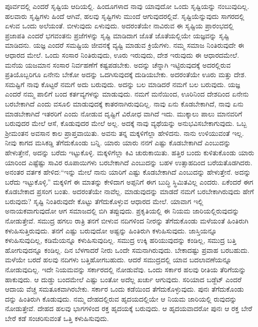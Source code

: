 ಪೂರ್ವದಲ್ಲಿ ಎಂದರೆ ಸೃಷ್ಟಿಯ ಆದಿಯಲ್ಲಿ. ಹಿಂದೂಗಳಾದ ನಾವು ಯಾವುದೋ ಒಂದು ಸೃಷ್ಟಿಯನ್ನು ನಂಬುವುದಿಲ್ಲ. ಹಲವಾರು ಸೃಷ್ಟಿಗಳು ಹಿಂದೆ ಆಗಿವೆ, ಹಲವು ಸೃಷ್ಟಿಗಳು ಮುಂದೆ ಆಗುವುದರಲ್ಲಿವೆ. ಸೃಷ್ಟಿಯೆನ್ನುವುದು ಸಾಗರದಲ್ಲಿ ಏಳುವ ಒಂದು ಅಲೆಯಂತೆ. ಬೀಳುವುದು ಏಳುವುದು. ಅದರಂತೆಯೇ ನಾವಿರುವ ಈ ಸೃಷ್ಟಿಯ ಪ್ರಾರಂಭದಲ್ಲಿ ಪ್ರಜಾಪತಿ ಎಂದರೆ ಭಗವಂತನು ಪ್ರಜೆಗಳನ್ನು ಸೃಷ್ಟಿ ಮಾಡಿದಾಗ ಜೊತೆ ಜೊತೆಯಲ್ಲಿಯೇ ಯಜ್ಞವನ್ನು ಸೃಷ್ಟಿ ಮಾಡಿದನು. ಯಜ್ಞ ಎಂದರೆ ಸಮಷ್ಟಿಯ ಜೀವನಕ್ಕೆ ವ್ಯಷ್ಟಿ ಮಾಡುವ ಕ್ರಿಯೆಗಳು. ನಮ್ಮ ಸಮಾಜ ನಿಂತಿರುವುದೇ ಈ ಆಧಾರದ ಮೇಲೆ. ಒಂದು ಸಂಸಾರ ನಿಂತಿರುವುದು, ಊರು ಇರುವುದು, ದೇಶ ಇರುವುದು ಈ ಆಧಾರದಮೇಲೆ. ಮನೆಯ ಯಜಮಾನ ಸಂಸಾರ ನಿರ್ವಹಣೆಗೆ ಕಷ್ಟಪಡಬೇಕು. ಅದನ್ನು ಚೆನ್ನಾಗಿ ಇಟ್ಟಿರುವುದಕ್ಕೆ ಅದರಲ್ಲಿರುವ ಪ್ರತಿಯೊಬ್ಬರಿಗೂ ಏನೇನು ಬೇಕೋ ಅದನ್ನು ಒದಗಿಸುವುದಕ್ಕೆ ದುಡಿಯಬೇಕು. ಅದರಂತೆಯೇ ಊರು ಮತ್ತು ದೇಶ. ಸಮಷ್ಟಿಗೆ ನಾವು ಕೊಟ್ಟರೆ ನಮಗೆ ಅದು ಬರುವುದು. ಅದನ್ನು ಬಲ ಮಾಡಿದರೆ ನಮಗೆ ಬಲ ಬರುವುದು. ಯಜ್ಞ ಎಂದರೆ ನಮ್ಮ ಪಾಲಿಗೆ ಬಂದ ಕರ್ತವ್ಯಗಳನ್ನು ಮಾಡುವುದು. ನಮಗೆ ಮನೆಯಿಂದ, ಊರಿನಿಂದ ದೇಶದಿಂದ ಏನೇನು ಬರಬೇಕಾಗಿದೆ ಎಂದು ವಸೂಲಿ ಮಾಡುವುದಕ್ಕೆ ಕಾತರನಾಗಿರುವುದಿಲ್ಲ. ನಾವು ಏನು ಕೊಡಬೇಕಾಗಿದೆ, ನಾವು ಏನು ಮಾಡಬೇಕಾಗಿದೆ ಇತರರಿಗೆ ಎಂದು ನೋಡುವ ದೃಷ್ಟಿಗೆ ವಿರೋಧ ವಾಗಿದೆ ಇದು. ಮುಕ್ಕಾಲು ಪಾಲು ಮಾನವರಿಗೆ ಬರುವುದರ ಮೇಲೆ ಆಸೆ, ಕೊಡುವುದರ ಮೇಲೆ ಅಲ್ಲ. ಅದಕ್ಕೆ ನಾವು ವ್ಯಥೆಯನ್ನು ಅನುಭವಿಸಬೇಕಾಗುವುದು. ಒಬ್ಬ ಶ‍್ರೀಮಂತನ ಅವಸಾನ ಕಾಲ ಪ್ರಾಪ್ತವಾಯಿತು. ಅವನು ತನ್ನ ಮಕ್ಕಳಿಗೆಲ್ಲಾ ಹೇಳಿದನು. ನಾನು ಉಳಿಯುವಂತೆ ಇಲ್ಲ. ನೀವು ಕಾಗದ ಮಸಿಕಡ್ಡಿ ತೆಗೆದುಕೊಂಡು ಬನ್ನಿ. ಯಾರು ಯಾರು ನನಗೆ ಎಷ್ಟು ಕೊಡಬೇಕಾಗಿದೆ ಎಂಬುದನ್ನು ಹೇಳುತ್ತೇನೆ, ಅದನ್ನು ಬರೆದು ಇಟ್ಟುಕೊಳ್ಳಿ. ಮಕ್ಕಳಿಗೆಲ್ಲಾ ಕಿವಿ ಚುರುಕಾಯಿತು. ಹತ್ತಿರ ಬಂದು ಕುಳಿತುಕೊಂಡು ಯಾರು ಯಾರಿಂದ ಎಷ್ಟೆಷ್ಟು ಸಾವಿರ ರೂಪಾಯಿಗಳು ಬರಬೇಕಾಗಿದೆ ಎಂಬುದನ್ನು ಬಹಳ ಉತ್ಸಾಹದಿಂದ ಬರೆಯತೊಡಗಿದರು. ಅನಂತರ ವರ್ತಕ ಹೇಳಿದ:“ಇನ್ನು ಮೇಲೆ ನಾನು ಯಾರಿಗೆ ಎಷ್ಟು ಕೊಡಬೇಕಾಗಿದೆ ಎಂಬುದನ್ನು ಹೇಳುತ್ತೇನೆ. ಅದನ್ನು ಬರೆದು ಇಟ್ಟುಕೊಳ್ಳಿ.” ಮಕ್ಕಳಿಗೆ ಈ ಮಾತನ್ನು ಕೇಳಿದಾಗ ಅಪ್ಪನಿಗೆ ಈಗ ಬುದ್ಧಿ ಸ್ಥಿಮಿತವಿಲ್ಲ ಎಂದರು. ಏಕೆಂದರೆ ಈಗ ಕೊಡಬೇಕಾದ ಪ್ರಸಂಗ ಬಂತು. ಅದರಂತೆಯೇ ನಾವೆಲ್ಲ. ಮಾಡುವುದನ್ನು ಮಾಡದೆ ನಮಗೆ ಬರಬೇಕಾಗಿರುವುದು ಹೇಗೆ ಬರುವುದು? ಸೃಷ್ಟಿ ನಿಂತಿರುವುದೇ ಕೊಟ್ಟು ತೆಗೆದುಕೊಳ್ಳುವ ಆಧಾರದ ಮೇಲೆ. ಯಾವಾಗ ಇಲ್ಲಿ ಅನಾಯಕವಾಗುವುದೋ ಆಗ ಸಮಾಜದಲ್ಲಿ ಬಿಗಿ ತಪ್ಪುವುದು. ಪ್ರಕೃತಿಯಲ್ಲಿ ಈ ನಿಯಮ ಜಾರಿಯಲ್ಲಿರುವುದನ್ನು ನೋಡುತ್ತೇವೆ. ಸಮುದ್ರ ಹಗಲು ರಾತ್ರಿ ತನಗೆ ಬೀಳುವ ನದಿಗಳಿಂದ ನೀರನ್ನು ತೆಗೆದುಕೊಂಡು ಮಳೆಯಂತೆ ಹಿಂತಿರುಗಿ ಕಳುಹಿಸುತ್ತಿರುವುದು. ತನಗೆ ಎಷ್ಟು ಬರುವುದೋ ಅಷ್ಟನ್ನು ಹಿಂತಿರುಗಿ ಕಳುಹಿಸುವುದು. ಜಾಸ್ತಿಯನ್ನೂ ಕಳುಹಿಸುವುದಿಲ್ಲ, ಕಡಿಮೆಯನ್ನೂ ಕಳುಹಿಸುವುದಿಲ್ಲ. ಸಮುದ್ರ ಉಕ್ಕಿ ಹರಿಯುವುದನ್ನು ಕಂಡಿಲ್ಲ, ಸಮುದ್ರ ಬತ್ತಿ ಹೋಗುವುದನ್ನೂ ಕಂಡಿಲ್ಲ. ದಿನ ಬೆಳಗಾದರೆ ನೀರು ಒಂದೇ ಸಮನಾಗಿರುವುದು. ಬೇಕಾದಷ್ಟು ಪ್ರವಾಹ ಬರಬಹುದು. ಮಳೆಯೇ ಬರದೆ ಹಲವು ನದಿಗಳು ಬತ್ತಿಹೋಗಬಹುದು. ಆದರೆ ಸಮುದ್ರದಲ್ಲಿ ಯಾವ ಬದಲಾವಣೆಯನ್ನೂ ನೋಡುವುದಿಲ್ಲ. ಇದೇ ನಿಯಮವನ್ನು ಸರ್ಕಾರದಲ್ಲಿ ನೋಡುವೆವು. ಒಂದು ಸರ್ಕಾರ ಹಲವು ರೀತಿಯ ತೆರಿಗೆಯನ್ನು ಹಾಕುವುದು. ಆ ದುಡ್ಡು ಬಂದಮೇಲೆ ಎಷ್ಟು ಬಂತೋ ಅದೆಲ್ಲ ಖರ್ಚು ಆಗುವುದು. ಸರಿಯಾದ ಬಡ್ಜೆಟ್ ಎಂದರೆ ಆದಾಯ ವೆಚ್ಚ ಸಮತೂಕವಾಗಿರಬೇಕು. ಸರ್ಕಾರ ಒಂದು ಕಡೆಯಿಂದ ತೆಗೆದುಕೊಳ್ಳುವುದು. ಪುನಃ ತೆಗೆದುಕೊಂಡು ದನ್ನು ಹಿಂತಿರುಗಿ ಕೊಡುವುದು. ನಮ್ಮ ದೇಹದಲ್ಲಿರುವ ಹೃದಯದಲ್ಲಿಯೇ ಆ ನಿಯಮ ಜಾರಿಯಲ್ಲಿ ರುವುದನ್ನು ನೋಡುತ್ತೇವೆ. ದೇಹದ ಹಲವು ಭಾಗಗಳಿಂದ ರಕ್ತ ಹೃದಯಕ್ಕೆ ಬರುವುದು. ಆ ಹೃದಯವಾದರೋ ಪುನಃ ಆ ರಕ್ತ ಬೇರೆ ಬೇರೆ ಕಡೆ ಸಂಚರಿಸುವಂತೆ ಒತ್ತಿ ಕಳುಹಿಸುವುದು.

